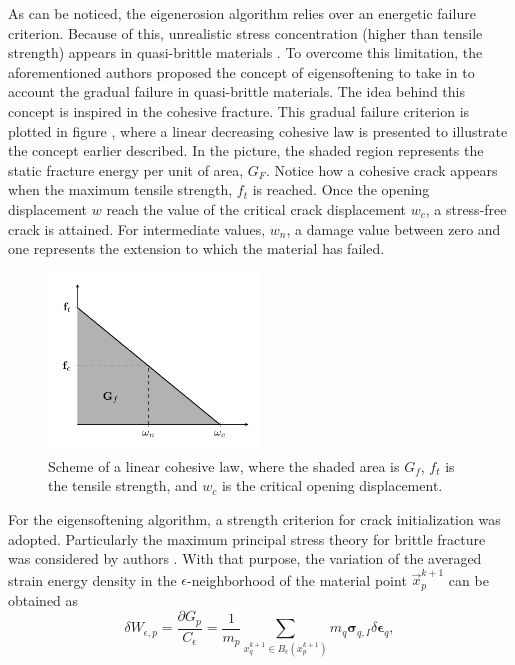 \documentclass[preprint,12pt,a4paper]{elsarticle}
\newcommand{\tens}[1]{
  \ensuremath{\mathbf{{#1}}}
}
\begin{document}
As can be noticed, the eigenerosion algorithm relies over an energetic
failure criterion. Because of this, unrealistic stress
concentration (higher than tensile strength) appears in quasi-brittle
materials \cite{Navas_2017_ES}. To overcome this limitation, the
aforementioned authors proposed the concept of eigensoftening to take
in to account the gradual failure in quasi-brittle materials. The idea
behind this concept is inspired in the cohesive fracture. This gradual
failure criterion is plotted in figure \label{fig:Damage-ft-wc}, where
a linear decreasing cohesive law is presented to illustrate the
concept earlier described. In the picture, the shaded region represents
the static fracture energy per unit of area, $G_F$. Notice how a
cohesive crack appears when the maximum tensile strength, $f_t$ is
reached. Once the opening displacement $w$ reach the value of the
critical crack displacement $w_c$, a stress-free crack is
attained. For intermediate values, $w_n$, a damage value between zero
and one represents the extension to which the material has failed.
\begin{figure}
  \centering
  \includegraphics[width=0.5\textwidth]{Figure-Damage}
  \caption{Scheme of a linear cohesive law, where the shaded area is
    $G_f$, $f_t$ is the tensile strength, and $w_c$ is the critical
    opening displacement.}
  \label{fig:Damage-ft-wc}
\end{figure}
For the eigensoftening algorithm, a strength criterion for crack
initialization was adopted. Particularly the maximum principal stress
theory for brittle fracture was considered by authors
\cite{Navas_2017_ES}. With that purpose, the variation of the averaged
strain energy density in the $\epsilon$-neighborhood of the material point
$\vec{x}_p^{k+1}$ can be obtained as
\begin{equation}
  \label{eq:variation-averaged-strain-energy-density}
  \delta W_{\epsilon,p} = \frac{\partial G_p}{C_{\epsilon}} =
  \frac{1}{m_p} \sum_{x_q^{k+1} \in
  B_{\epsilon}(x_p^{k+1})} m_q \tens{\sigma}_{q,I} \delta \tens{\epsilon}_q,
\end{equation}
\end{document}
